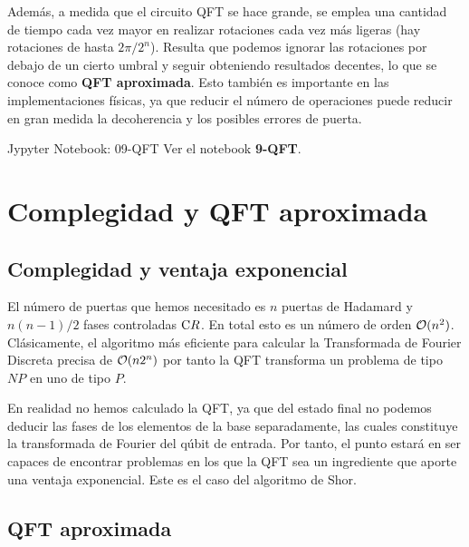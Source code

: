 \documentclass[a4paper,11pt]{book} %
\numberwithin{equation}{chapter}
\newcommand{\cg}[1]{{\rm C}#1}
\begin{document}
Además, a medida que el circuito QFT se hace grande, se emplea una cantidad de tiempo cada vez mayor en realizar rotaciones cada vez más ligeras (hay rotaciones de hasta $2\pi/2^n$). Resulta que podemos ignorar las rotaciones por debajo de un cierto umbral y seguir obteniendo resultados decentes, lo que se conoce como \textbf{QFT aproximada}. Esto también es importante en las implementaciones físicas, ya que reducir el número de operaciones puede reducir en gran medida la decoherencia y los posibles errores de puerta.
 
	\begin{mybox_orange}{Jypyter Notebook: 09-QFT}
	Ver el notebook \textbf{9-QFT}.
	\end{mybox_orange}

	
	
\section{Complegidad y QFT aproximada}

	\subsection{Complegidad y ventaja exponencial}
	
El número de puertas que hemos necesitado es $n$ puertas de Hadamard y $n(n-1)/2$ fases controladas $\cg{R}$. En total esto es un número de orden ${\cal O}(n^2)$.  Clásicamente, el algoritmo más eficiente para calcular la Transformada de Fourier Discreta precisa de ${\cal O}(n 2^n)$ por tanto la QFT transforma un problema de tipo  $NP$ en uno de tipo $P$. 

En realidad no hemos calculado la QFT, ya que del estado final no podemos deducir las fases  de los elementos de la base separadamente, las cuales constituye la transformada de Fourier del qúbit de entrada. Por tanto, el punto estará en ser capaces de encontrar problemas en los que la QFT sea un ingrediente que aporte una ventaja exponencial. Este es el caso del algoritmo de Shor.

	\subsection{QFT aproximada}
	
\end{document}
